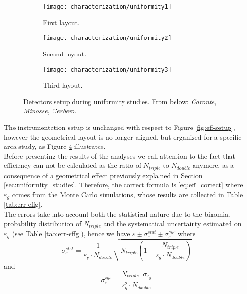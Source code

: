 \begin{figure}[!hbtp]
	\centering
	\begin{subfigure}{.3\linewidth}
		\centering
		\texttt{[image: characterization/uniformity1]}
		\caption{First layout.} 
		\label{subfig:uniformity1}
	\end{subfigure}\hfill
	\begin{subfigure}{.3\linewidth}
		\centering
		\texttt{[image: characterization/uniformity2]}
		\caption{Second layout.} 
		\label{subfig:uniformity2}
	\end{subfigure}\hfill
	\begin{subfigure}{.3\linewidth}
		\centering
		\texttt{[image: characterization/uniformity3]}
		\caption{Third layout.} 
		\label{subfig:uniformity3}
	\end{subfigure}
	\caption{Detectors setup during uniformity studies. From below: \emph{Caronte}, \emph{Minosse}, \emph{Cerbero}.}
	\label{fig:uniformity}
\end{figure}

The instrumentation setup is unchanged with respect to Figure \ref{fig:eff-setup}, however the geometrical layout is no longer aligned, but organized for a specific area study, as Figure \ref{fig:uniformity} illustrates.\\

Before presenting the results of the analyses we call attention to the fact that efficiency can not be calculated as the ratio of $N_{triple}$ to  $N_{double}$ anymore, as a consequence of a geometrical effect previously explained in Section \ref{sec:uniformity_studies}. Therefore, the correct formula is \eqref{eq:eff_correct} where $\varepsilon_{g}$ comes from the Monte Carlo simulations, whose results are collected in Table \ref{tab:err-effg}.\\

The errors take into account both the statistical nature due to the binomial probability distribution of $N_{triple}$ and the systematical uncertainty estimated on $\varepsilon_{g}$ (see Table \ref{tab:err-effg}), hence we have $\varepsilon\pm \sigma_{\varepsilon}^{stat} \pm \sigma_{\varepsilon}^{sys}$ where
\begin{equation}
\sigma_{\varepsilon}^{stat}=\displaystyle\frac{1}{\varepsilon_{g}\cdot N_{double}}\sqrt{N_{triple}\left(1-\frac{N_{triple}}{\varepsilon_{g}\cdot N_{double}}\right)}
\end{equation}
and
\begin{equation}
\sigma_{\varepsilon}^{sys}=\frac{N_{triple}\cdot\sigma_{\varepsilon_{g}}}{\varepsilon_{g}^2\cdot N_{double}}
\end{equation}

